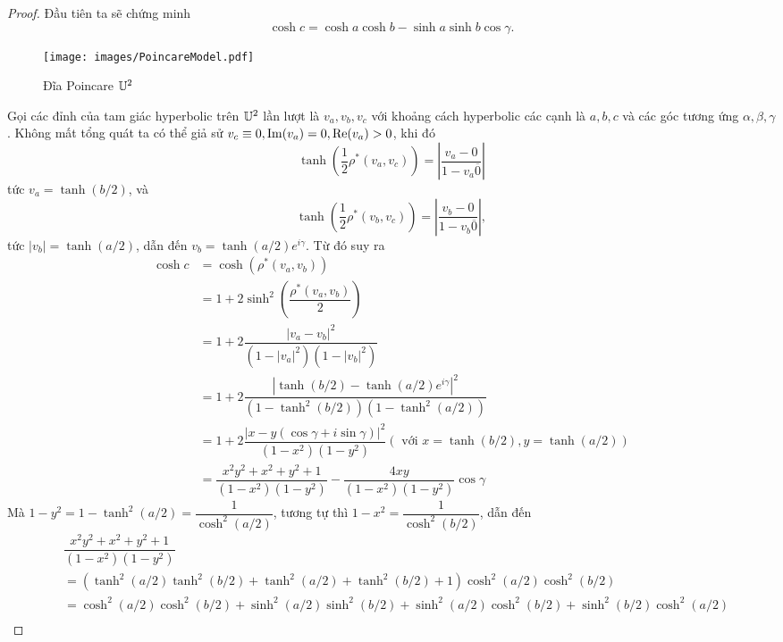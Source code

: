 \begin{proof}
Đầu tiên ta sẽ chứng minh 
\[\cosh c = \cosh a \cosh b - \sinh a \sinh b \cos{\gamma}.\]
    \begin{figure}[htp]
        \centering
        \texttt{[image: images/PoincareModel.pdf]}
        \caption{Đĩa Poincare $\mathbb{U}^2$}
        \label{fig:enter-label}
    \end{figure}
    Gọi các đỉnh của tam giác hyperbolic trên $\mathbb{U}^2$ lần lượt là $v_a,v_b,v_c$ với khoảng cách hyperbolic các cạnh là $a,b,c$ và các góc tương ứng $\alpha, \beta, \gamma$. Không mất tổng quát ta có thể giả sử $v_c \equiv 0, \operatorname{Im}(v_a) = 0, \operatorname{Re}(v_a) > 0$, khi đó 
        \[\tanh{\left(\dfrac{1}{2}\rho^*(v_a,v_c)\right)} = \left|\dfrac{v_a-0}{1-v_a\overline{0}}\right|\]
        tức $v_a = \tanh{(b/2)}$, và 
        \[\tanh{\left(\dfrac{1}{2}\rho^*(v_b,v_c)\right)} = \left|\dfrac{v_b-0}{1-v_b\overline{0}}\right|,\]
        tức $|v_b| = \tanh{(a/2)}$, dẫn đến $v_b = \tanh{(a/2)}e^{i\gamma}$.
        Từ đó suy ra
        \begin{align*}
            \cosh c &= \cosh(\rho^*(v_a,v_b)) \\
            &= 1+ 2 \sinh^2{\left(\dfrac{\rho^*(v_a,v_b)}{2}\right)}\\
            &= 1+ 2 \dfrac{|v_a -v_b|^2}{(1-|v_a|^2)(1-|v_b|^2)}\\
            &= 1+ 2 \dfrac{|\tanh{(b/2)} -\tanh{(a/2)}e^{i\gamma}|^2}{(1-\tanh^2{(b/2)})(1-\tanh^2{(a/2)})}\\
            &= 1+ 2\dfrac{|x-y(\cos{\gamma} + i \sin{\gamma})|^2}{(1-x^2)(1-y^2)} (\text{ với } x = \tanh{(b/2)}, y = \tanh{(a/2)})\\
            &= \dfrac{x^2y^2+x^2+y^2+1}{(1-x^2)(1-y^2)}-\dfrac{4xy}{(1-x^2)(1-y^2)}\cos{\gamma}
        \end{align*}
        Mà $1-y^2 = 1 - \tanh^2{(a/2)} 
        = \dfrac{1}{\cosh^2(a/2)}$, tương tự thì 
        $1-x^2 = \dfrac{1}{\cosh^2(b/2)}$, dẫn đến 
        \begin{align*}
            &\dfrac{x^2y^2+x^2+y^2+1}{(1-x^2)(1-y^2)}\\
            &= (\tanh^2(a/2)\tanh^2(b/2) + \tanh^2(a/2) + \tanh^2(b/2) +1)\cosh^2(a/2)\cosh^2(b/2)\\
            &= \cosh^2(a/2)\cosh^2(b/2) + \sinh^2(a/2)\sinh^2(b/2) + \sinh^2(a/2)\cosh^2(b/2) + \sinh^2(b/2)\cosh^2(a/2)\\

\end{align*}
\end{proof}
